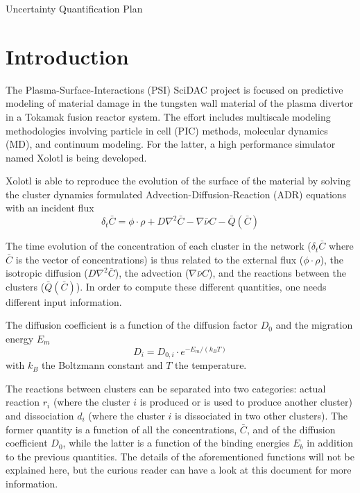 \documentclass{article}
\begin{document}
\begin{center}
\huge{Uncertainty Quantification Plan}
\end{center}

\vspace{0.2in}

\section{Introduction}

The Plasma-Surface-Interactions (PSI) SciDAC project is focused on predictive
modeling of material damage in the tungsten wall material of the plasma divertor
in a Tokamak fusion reactor system. The effort includes multiscale modeling
methodologies involving particle in cell (PIC) methods, molecular dynamics (MD),
and continuum modeling. For the latter, a high performance simulator named
Xolotl is being developed.

Xolotl is able to reproduce the evolution of the surface of the material by
solving the cluster dynamics formulated Advection-Diffusion-Reaction (ADR)
equations with an incident flux
\begin{equation}
	\delta_t \bar{C} = \phi \cdot \rho + D \nabla^2 \bar{C} - \nabla \bar{\nu}C -
	\bar{Q}(\bar{C})
\end{equation}

The time evolution of the concentration of each cluster in the network
($\delta_t \bar{C}$ where $\bar{C}$ is the vector of concentrations) is thus
related to the external flux ($\phi \cdot \rho$), the isotropic diffusion ($D
\nabla^2 \bar{C}$), the advection ($\nabla \bar{\nu}C$), and the reactions
between the clusters ($\bar{Q}(\bar{C})$). In order to compute these different
quantities, one needs different input information.

The diffusion coefficient is a function of the diffusion factor
$D_0$ and the migration energy $E_m$
\begin{equation}
	D_i = D_{0,i} \cdot e^{-E_m/(k_B T)}
\end{equation}
with $k_B$ the Boltzmann constant and $T$ the temperature.

The reactions between clusters can be separated into two categories: actual
reaction $r_i$ (where the cluster $i$ is produced or is used to produce another
cluster) and dissociation $d_i$ (where the cluster $i$ is dissociated in two
other clusters). The former quantity is a function of all the concentrations,
$\bar{C}$, and of the diffusion coefficient $D_0$, while the latter is a
function of the binding energies $E_b$ in addition to the previous quantities. The
details of the aforementioned functions will not be explained here, but the
curious reader can have a look at this
document \cite{math} for more information.
\end{document}
